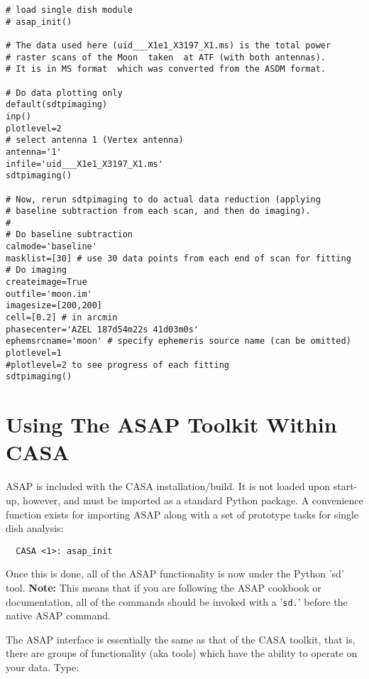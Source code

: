 \begin{verbatim}
# load single dish module
# asap_init()

# The data used here (uid___X1e1_X3197_X1.ms) is the total power 
# raster scans of the Moon  taken  at ATF (with both antennas). 
# It is in MS format  which was converted from the ASDM format.

# Do data plotting only
default(sdtpimaging)
inp()
plotlevel=2
# select antenna 1 (Vertex antenna) 
antenna='1'
infile='uid___X1e1_X3197_X1.ms'
sdtpimaging()

# Now, rerun sdtpimaging to do actual data reduction (applying
# baseline subtraction from each scan, and then do imaging).
#
# Do baseline subtraction 
calmode='baseline'
masklist=[30] # use 30 data points from each end of scan for fitting
# Do imaging 
createimage=True
outfile='moon.im'
imagesize=[200,200]
cell=[0.2] # in arcmin
phasecenter='AZEL 187d54m22s 41d03m0s'  
ephemsrcname='moon' # specify ephemeris source name (can be omitted)
plotlevel=1
#plotlevel=2 to see progress of each fitting
sdtpimaging()
\end{verbatim}



\section{Using The ASAP Toolkit Within CASA}
\label{section:sd.asap}

ASAP is included with the CASA installation/build. It is not loaded
upon start-up, however, and must be imported as a standard Python
package. A convenience function exists for importing ASAP along with
a set of prototype tasks for single dish analysis:
\small
\begin{verbatim}
  CASA <1>: asap_init
\end{verbatim}
\normalsize
Once this is done, all of the ASAP functionality is now under the
Python 'sd' tool.  {\bf Note:} This means that if you are following
the ASAP cookbook or documentation, all of the commands should be 
invoked with a '{\tt sd.}' before the native ASAP command.

The ASAP interface is essentially the same as that
of the CASA toolkit, that is, there are groups of functionality (aka
tools) which have the ability to operate on your data. Type:

